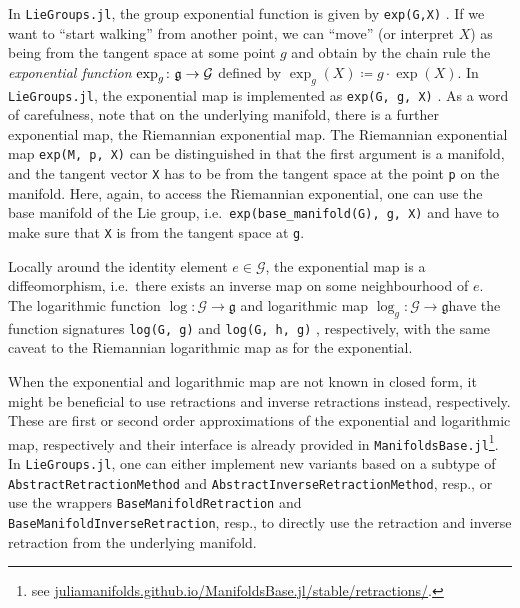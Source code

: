 \documentclass{juliacon}
\newcommand{\term}[1]{\emph{#1}}
\begin{document}
In \verb|LieGroups.jl|, the group exponential function is given by \verb|exp(G,X)|%
.
If we want to “start walking” from another point, we can “move” (or interpret $X$) as being from the tangent space at some point $g$ and obtain by the chain rule the \term{exponential function} $\exp_g\colon\frak g\to\mathcal G$ defined by $\exp_g(X)\coloneqq g \cdot \exp(X)$.
In \verb|LieGroups.jl|, the exponential map is implemented as \verb|exp(G, g, X)|%
.
As a word of carefulness, note that on the underlying manifold, there is a further exponential map, the Riemannian exponential map. The Riemannian exponential map \verb|exp(M, p, X)|
can be distinguished in that the first argument is a manifold, and the tangent vector \verb|X| has to be from the tangent space at the point \verb|p| on the manifold.
Here, again, to access the Riemannian exponential, one can use the base manifold of the Lie group, i.e.\ \verb|exp(base_manifold(G), g, X)| and have to make sure that \verb|X| is from the tangent space at \verb|g|.

Locally around the identity element $e\in\mathcal G$, the exponential map is a diffeomorphism, i.e.\ there exists an inverse map on some neighbourhood of $e$. The logarithmic function \(\log\colon \mathcal{G} \to \mathfrak{g}\) and logarithmic map \(\log_g\colon \mathcal{G} \to \mathfrak{g}\)have the function signatures \verb|log(G, g)|%
and \verb|log(G, h, g)|%
, respectively, with the same caveat to the Riemannian logarithmic map as for the exponential.

When the exponential and logarithmic map are not known in closed form, it might be beneficial to use retractions and inverse retractions instead, respectively.
These are first or second order approximations of the exponential and logarithmic map, respectively and their interface is already provided in \verb|ManifoldsBase.jl|\footnote{see \href{https://juliamanifolds.github.io/ManifoldsBase.jl/stable/retractions/}{juliamanifolds.github.io/ManifoldsBase.jl/stable/retractions/}.}.
In \verb|LieGroups.jl|, one can either implement new variants based on a subtype of \verb|AbstractRetractionMethod| and \verb|AbstractInverseRetractionMethod|, resp., or use the wrappers \verb|BaseManifoldRetraction| and \verb|BaseManifoldInverseRetraction|, resp., to directly use the retraction and inverse retraction from the underlying manifold.
\end{document}
